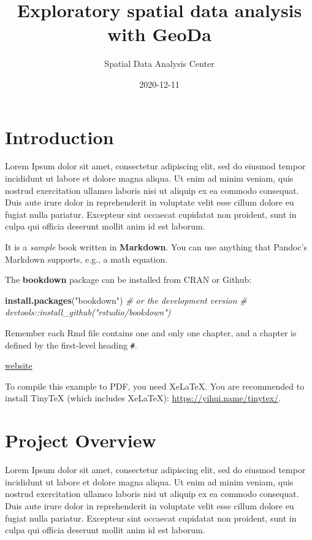 \documentclass[
]{book}
\title{Exploratory spatial data analysis with GeoDa}
\author{Spatial Data Analysis Center}
\date{2020-12-11}
\newenvironment{Shaded}{\begin{snugshade}}{\end{snugshade}}
\newcommand{\CommentTok}[1]{\textcolor[rgb]{0.56,0.35,0.01}{\textit{#1}}}
\newcommand{\KeywordTok}[1]{\textcolor[rgb]{0.13,0.29,0.53}{\textbf{#1}}}
\newcommand{\NormalTok}[1]{#1}
\newcommand{\StringTok}[1]{\textcolor[rgb]{0.31,0.60,0.02}{#1}}
\begin{document}
\maketitle

{
\setcounter{tocdepth}{1}
\tableofcontents
}
\hypertarget{introduction}{%
\chapter*{Introduction}\label{introduction}}

Lorem Ipsum dolor sit amet, consectetur adipiscing elit, sed do eiusmod tempor incididunt ut labore et dolore magna aliqua. Ut enim ad minim veniam, quis nostrud exercitation ullamco laboris nisi ut aliquip ex ea commodo consequat. Duis aute irure dolor in reprehenderit in voluptate velit esse cillum dolore eu fugiat nulla pariatur. Excepteur sint occaecat cupidatat non proident, sunt in culpa qui officia deserunt mollit anim id est laborum.

It is a \emph{sample} book written in \textbf{Markdown}. You can use anything that Pandoc's Markdown supports, e.g., a math equation.

The \textbf{bookdown} package can be installed from CRAN or Github:

\begin{Shaded}
\begin{Highlighting}[]
\KeywordTok{install.packages}\NormalTok{(}\StringTok{"bookdown"}\NormalTok{)}
\CommentTok{# or the development version}
\CommentTok{# devtools::install_github("rstudio/bookdown")}
\end{Highlighting}
\end{Shaded}

Remember each Rmd file contains one and only one chapter, and a chapter is defined by the first-level heading \texttt{\#}.

\href{https://yihui.name/tinytex/}{website}

To compile this example to PDF, you need XeLaTeX. You are recommended to install TinyTeX (which includes XeLaTeX): \url{https://yihui.name/tinytex/}.

\hypertarget{intro}{%
\chapter{Project Overview}\label{intro}}

Lorem Ipsum dolor sit amet, consectetur adipiscing elit, sed do eiusmod tempor incididunt ut labore et dolore magna aliqua. Ut enim ad minim veniam, quis nostrud exercitation ullamco laboris nisi ut aliquip ex ea commodo consequat. Duis aute irure dolor in reprehenderit in voluptate velit esse cillum dolore eu fugiat nulla pariatur. Excepteur sint occaecat cupidatat non proident, sunt in culpa qui officia deserunt mollit anim id est laborum.
\end{document}

